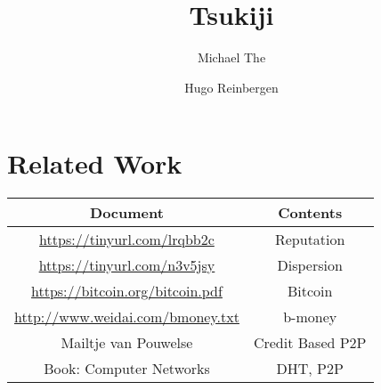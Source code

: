 \documentclass[]{article}
\title{Tsukiji}
\author{Michael The \and Hugo Reinbergen}
\begin{document}
\maketitle

\section*{Related Work}
\begin{tabular}{|c|c|}
 \hline
 Document & Contents  \\
 \hline
 \url{https://tinyurl.com/lrqbb2c} & Reputation \\
 \url{https://tinyurl.com/n3v5jsy} & Dispersion \\
 \url{https://bitcoin.org/bitcoin.pdf} & Bitcoin \\
 \url{http://www.weidai.com/bmoney.txt} & b-money \\
 Mailtje van Pouwelse & Credit Based P2P \\
 Book: Computer Networks & DHT, P2P \\
 \hline
\end{tabular}




\tableofcontents







\end{document}
